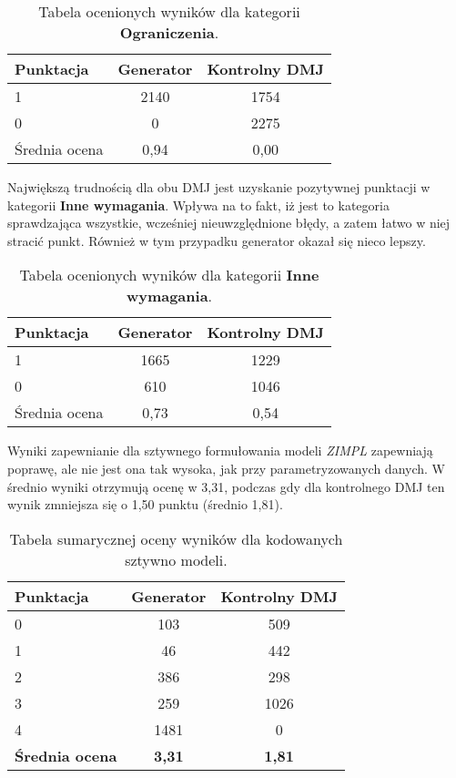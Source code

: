 \begin{table}[H]
\caption{Tabela ocenionych wyników dla kategorii \textbf{Ograniczenia}.}\label{tab:tabela14}
\centering%
\begin{tabular}{|l|c|c|}
\hline
\textbf{Punktacja} & \textbf{Generator} & \textbf{Kontrolny DMJ}\\
\hline
1 & 2140 & 1754 \\
\hline
0 & 0 & 2275 \\
\hline
Średnia ocena & 0,94 & 0,00 \\
\hline
\end{tabular}
\end{table}


Największą trudnością dla obu DMJ jest uzyskanie pozytywnej punktacji w kategorii \textbf{Inne wymagania}. Wpływa na to fakt, iż jest to kategoria sprawdzająca wszystkie, wcześniej nieuwzględnione błędy, a zatem łatwo w niej stracić punkt. Również w tym przypadku generator okazał się nieco lepszy.

\begin{table}[H]
\caption{Tabela ocenionych wyników dla kategorii \textbf{Inne wymagania}.}\label{tab:tabela15}
\centering%
\begin{tabular}{|l|c|c|}
\hline
\textbf{Punktacja} & \textbf{Generator} & \textbf{Kontrolny DMJ}\\
\hline
1 & 1665 & 1229 \\
\hline
0 & 610 & 1046 \\
\hline
Średnia ocena & 0,73 & 0,54 \\
\hline
\end{tabular}
\end{table}


Wyniki zapewnianie dla sztywnego formułowania modeli  \textit{ZIMPL} zapewniają poprawę, ale nie jest ona tak wysoka, jak przy parametryzowanych danych. W średnio wyniki otrzymują ocenę w 3,31, podczas gdy dla kontrolnego DMJ ten wynik zmniejsza się o 1,50 punktu (średnio 1,81).

\begin{table}[H]
\caption{Tabela sumarycznej oceny wyników dla kodowanych sztywno modeli.}\label{tab:tabela16}
\centering%
\begin{tabular}{|l|c|c|}
\hline
\textbf{Punktacja} & \textbf{Generator} & \textbf{Kontrolny DMJ}\\
\hline
0 & 103 & 509 \\
\hline
1 & 46 & 442 \\
\hline
2 & 386 & 298 \\
\hline
3 & 259 & 1026 \\
\hline
4 & 1481 & 0 \\
\hline
\textbf{Średnia ocena} & \textbf{3,31} & \textbf{1,81} \\
\hline
\end{tabular}
\end{table}

